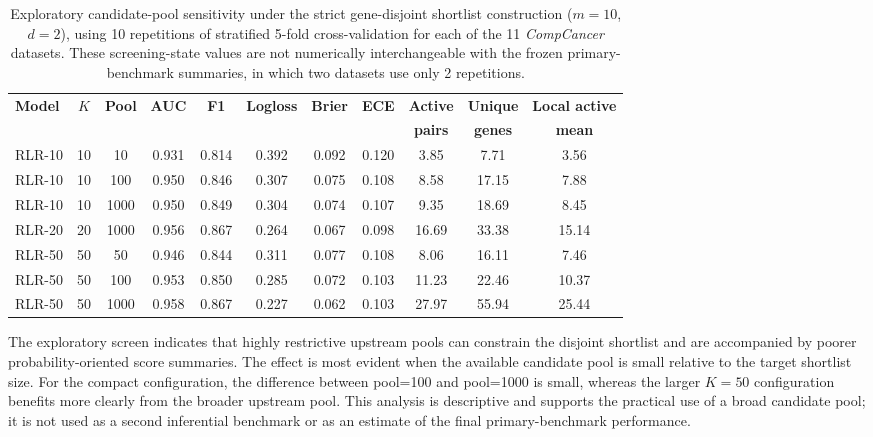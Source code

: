 \documentclass[11pt, a4paper]{article}
\newcommand{\stdtablefont}{\small}
\newcommand{\stdtablelayout}{%
  \stdtablefont
  \setlength{\tabcolsep}{4pt}
  \renewcommand{\arraystretch}{1.2}
}
\begin{document}
\begin{table}[!htbp]
\centering
\caption{Exploratory candidate-pool sensitivity under the strict gene-disjoint shortlist construction ($m=10$, $d=2$), using 10 repetitions of stratified 5-fold cross-validation for each of the 11 \emph{CompCancer} datasets. These screening-state values are not numerically interchangeable with the frozen primary-benchmark summaries, in which two datasets use only 2 repetitions.}
\label{tab:pool_ablation}
{\stdtablelayout
\begin{tabular}{lcccccccccc}
\toprule
\textbf{Model} & \textbf{$K$} & \textbf{Pool} & \textbf{AUC} & \textbf{F1} & \textbf{Logloss} & \textbf{Brier} & \textbf{ECE} & \textbf{Active} & \textbf{Unique} & \textbf{Local active} \\
 & & & & & & & & \textbf{pairs} & \textbf{genes} & \textbf{mean} \\
\midrule
RLR-10  & 10 & 10   & 0.931 & 0.814 & 0.392 & 0.092 & 0.120 & 3.85  & 7.71  & 3.56 \\
RLR-10  & 10 & 100  & 0.950 & 0.846 & 0.307 & 0.075 & 0.108 & 8.58  & 17.15 & 7.88 \\
RLR-10  & 10 & 1000 & 0.950 & 0.849 & 0.304 & 0.074 & 0.107 & 9.35  & 18.69 & 8.45 \\
\midrule
RLR-20  & 20 & 1000 & 0.956 & 0.867 & 0.264 & 0.067 & 0.098 & 16.69 & 33.38 & 15.14 \\
\midrule
RLR-50  & 50 & 50   & 0.946 & 0.844 & 0.311 & 0.077 & 0.108 & 8.06  & 16.11 & 7.46 \\
RLR-50  & 50 & 100  & 0.953 & 0.850 & 0.285 & 0.072 & 0.103 & 11.23 & 22.46 & 10.37 \\
RLR-50  & 50 & 1000 & 0.958 & 0.867 & 0.227 & 0.062 & 0.103 & 27.97 & 55.94 & 25.44 \\
\bottomrule
\end{tabular}
}
\end{table}

The exploratory screen indicates that highly restrictive upstream pools can constrain the disjoint shortlist and are accompanied by poorer probability-oriented score summaries. The effect is most evident when the available candidate pool is small relative to the target shortlist size. For the compact configuration, the difference between pool=100 and pool=1000 is small, whereas the larger $K=50$ configuration benefits more clearly from the broader upstream pool. This analysis is descriptive and supports the practical use of a broad candidate pool; it is not used as a second inferential benchmark or as an estimate of the final primary-benchmark performance.
\end{document}
